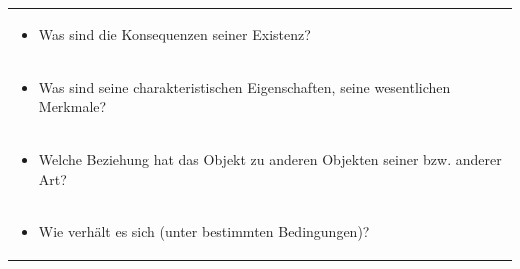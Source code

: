 \documentclass[]{book}
\providecommand{\tightlist}{%
  \setlength{\itemsep}{0pt}\setlength{\parskip}{0pt}}
\theoremstyle{definition}
\theoremstyle{definition}
\theoremstyle{definition}
\theoremstyle{remark}
\begin{document}
\begin{longtable}[]{@{}l@{}}
\begin{minipage}[t]{0.97\columnwidth}
\begin{itemize}
\tightlist
\item
  Was sind die Konsequenzen seiner Existenz? \vspace{-6mm}
\end{itemize}\strut
\end{minipage}\tabularnewline
\begin{minipage}[t]{0.97\columnwidth}\raggedright\strut
\begin{itemize}
\tightlist
\item
  Was sind seine charakteristischen Eigenschaften, seine wesentlichen
  Merkmale? \vspace{-6mm}
\end{itemize}\strut
\end{minipage}\tabularnewline
\begin{minipage}[t]{0.97\columnwidth}\raggedright\strut
\begin{itemize}
\tightlist
\item
  Welche Beziehung hat das Objekt zu anderen Objekten seiner bzw.
  anderer Art? \vspace{-6mm}
\end{itemize}\strut
\end{minipage}\tabularnewline
\begin{minipage}[t]{0.97\columnwidth}\raggedright\strut
\begin{itemize}
\tightlist
\item
  Wie verhält es sich (unter bestimmten Bedingungen)?
\end{itemize}\strut
\end{minipage}\tabularnewline
\bottomrule
\end{longtable}
\end{document}
